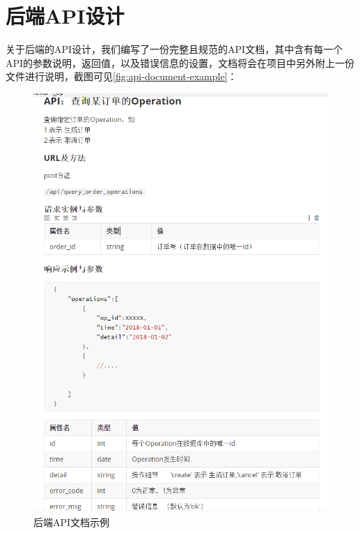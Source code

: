\documentclass{myreport}
\begin{document}
\section{后端API设计}


关于后端的API设计，我们编写了一份完整且规范的API文档，其中含有每一个API的参数说明，返回值，以及错误信息的设置，文档将会在项目中另外附上一份文件进行说明，截图可见\autoref{fig:api-document-example}：

\begin{figure}[htp]
    \centering
    \includegraphics[width=13cm]{figure/2018-12-22-12-14-27.png}
    \caption{后端API文档示例}
    \label{fig:api-document-example}
\end{figure}
\end{document}
